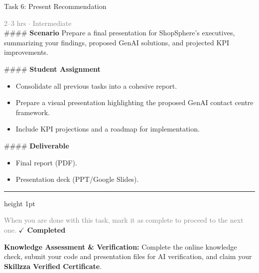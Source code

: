 \documentclass[10pt,a4paper]{article}
\begin{document}
\begin{taskbox}{Task 6: Present Recommendation}

    {\small \textcolor{gray}{2--3 hrs $\cdot$ Intermediate}}\\[12pt]

    \#\#\#\# \textbf{Scenario}  
Prepare a final presentation for ShopSphere’s executives, summarizing your findings, proposed GenAI solutions, and projected KPI improvements.  

\#\#\#\# \textbf{Student Assignment}  
\begin{itemize}
    \item Consolidate all previous tasks into a cohesive report.  
    \item Prepare a visual presentation highlighting the proposed GenAI contact centre framework.  
    \item Include KPI projections and a roadmap for implementation.  
\end{itemize}

\#\#\#\# \textbf{Deliverable}  
\begin{itemize}
    \item Final report (PDF).  
    \item Presentation deck (PPT/Google Slides).\par
\end{itemize}

    \vspace{16pt}

    \textcolor{cardBorder}{\hrule height 1pt}\vspace{8pt}

    \small \textcolor{gray}{When you are done with this task, mark it as complete to proceed to the next one.} \hfill \textbf{\textcolor{brandDark}{$\checkmark$ Completed}}

\end{taskbox}

\begin{completionbox}
    \textbf{Knowledge Assessment \& Verification:} Complete the online knowledge check, submit your code and presentation files for AI verification, and claim your \textbf{Skillzza Verified Certificate}.
\end{completionbox}

\newpage



\end{document}
